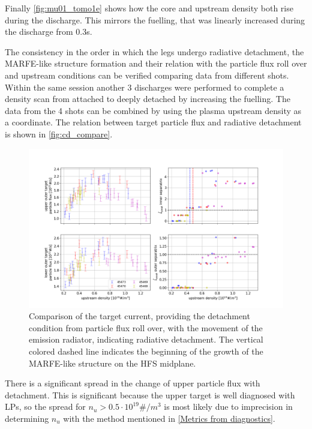 Finally \autoref{fig:mu01_tomo1e} shows how the core and upstream density both rise during the discharge. This mirrors the fuelling, that was linearly increased during the discharge from 0.3s.


The consistency in the order in which the legs undergo radiative detachment, the MARFE-like structure formation and their relation with the particle flux roll over and upstream conditions can be verified comparing data from different shots. Within the same session another 3 discharges were performed to complete a density scan from attached to deeply detached by increasing the fuelling. The data from the 4 shots can be combined by using the plasma upstream density as a coordinate. The relation between target particle flux and radiative detachment is shown in \autoref{fig:cd_compare}.
\begin{figure}[!ht]
	\centering
	\includegraphics[trim={70 30 110 50},clip,width=\linewidth]{Chapters/chapter2/figs/CD_OH_MU01_compare2.png}
	\caption{Comparison of the target current, providing the detachment condition from particle flux roll over, with the movement of the emission radiator, indicating radiative detachment. The vertical colored dashed line indicates the beginning of the growth of the MARFE-like structure on the HFS midplane.}
	\label{fig:cd_compare}
\end{figure}
There is a significant spread in the change of upper particle flux with detachment. This is significant because the upper target is well diagnosed with LPs, so the spread for $n_u > 0.5\cdot 10^{19} \#/m^3$ is most likely due to imprecision in determining $n_u$ with the method mentioned in \autoref{Metrics from diagnostics}. %
